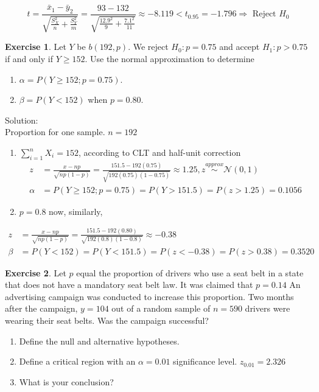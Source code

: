 \documentclass[
]{book}
\theoremstyle{definition}
\theoremstyle{definition}
\theoremstyle{definition}
\newtheorem{exercise}{Exercise}[chapter]
\theoremstyle{remark}
\begin{document}
\begin{equation}
t=\frac{\bar{x}_{1}-\bar{y}_{2}}{\sqrt{\frac{S_{X}^{2}}{n}+\frac{S_{Y}^{2}}{m}}}=\frac{93-132}{\sqrt{\frac{12.9^{2}}{9}+\frac{7.1^{2}}{11}}} \approx-8.119<t_{0.95}=-1.796 \Rightarrow \text { Reject } H_{0}
\end{equation}

\begin{exercise}
\protect\hypertarget{exr:q72}{}{\label{exr:q72} }Let \(Y\) be \(b(192, p) .\) We reject \(H_{0}: p=0.75\) and accept \(H_{1}: p>0.75\) if and only if \(Y \geq 152 .\) Use the normal approximation to determine

\begin{enumerate}
\def\labelenumi{\arabic{enumi}.}
\item
  \(\alpha=P(Y \geq 152 ; p=0.75)\).
\item
  \(\beta=P(Y<152)\) when \(p=0.80\).
\end{enumerate}
\end{exercise}

Solution:\\

Proportion for one sample. \(n=192\)

\begin{enumerate}
\def\labelenumi{\arabic{enumi}.}
\item
  \(\sum_{i=1}^n X_i = 152\), according to CLT and half-unit correction
  \begin{align}
  z&=\frac{x-n p}{\sqrt{n p(1-p)}}=\frac{151.5-192(0.75)}{\sqrt{192(0.75)(1-0.75)}} \approx 1.25, z\stackrel{approx}{\sim}\mathcal{N}(0,1)\\
  \alpha&=P(Y \geq 152 ; p=0.75)=P(Y>151.5)=P(z>1.25)=0.1056
  \end{align}
\item
  \(p=0.8\) now, similarly,
\end{enumerate}

\begin{align}
z &=\frac{x-n p}{\sqrt{n p(1-p)}}=\frac{151.5-192(0.80)}{\sqrt{192(0.8)(1-0.8)}} \approx-0.38 \\
\beta &=P(Y<152)=P(Y<151.5)=P(z<-0.38)=P(z>0.38)=0.3520
\end{align}

\begin{exercise}
\protect\hypertarget{exr:q73}{}{\label{exr:q73} }Let \(p\) equal the proportion of drivers who use a seat belt in a state that does not have a mandatory seat belt law. It was claimed that \(p=0.14\) An advertising campaign was conducted to increase this proportion. Two months after the campaign, \(y=104\) out of a random sample of \(n=590\) drivers were wearing their seat belts. Was the campaign successful?

\begin{enumerate}
\def\labelenumi{\arabic{enumi}.}
\item
  Define the null and alternative hypotheses.
\item
  Define a critical region with an \(\alpha=0.01\) significance level. \(z_{0.01} = 2.326\)
\item
  What is your conclusion?
\end{enumerate}
\end{exercise}
\end{document}
